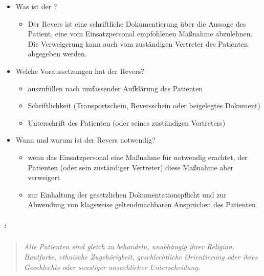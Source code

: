 \begin{itemize}
    \item Was ist der ?
    \begin{itemize}
        \item {\mdseries
        Der Revers ist eine schriftliche Dokumentierung \"uber die Aussage des
        Patient, eine vom Einsatz\-personal empfohlenen Ma{\ss}nahme
        abzulehnen. Die Verweigerung kann auch vom zuständigen Vertreter des
        Patienten abgegeben werden.}
    \end{itemize}
\end{itemize}
\begin{itemize}
    \item Welche Voraussetzungen hat der Revers?
    \begin{itemize}
        \item auszuf\"ullen nach umfassender Aufklärung des Patienten
        \item Schriftlichkeit (Transportschein, Reversschein oder beigelegtes
        Dokument)
        \item Unterschrift des Patienten (oder seines zuständigen Vertreters)
    \end{itemize}
\end{itemize}
\begin{itemize}
    \item Wann und warum ist der Revers notwendig?
    \begin{itemize}
        \item {\mdseries
        wenn das Einsatzpersonal eine Ma{\ss}nahme f\"ur notwendig erachtet,
        der Patienten  (oder sein zuständiger Vertreter) diese Ma{\ss}nahme
        aber verweigert}
        \item zur Einhaltung der gesetzlichen Dokumentationspflicht und zur Abwendung
        von  klagsweise geltendmachbaren Anspr\"uchen des Patienten
    \end{itemize}
\end{itemize}

\subparagraph*{:}

\begin{quote}
\emph{Alle Patienten sind gleich zu behandeln, unabhängig ihrer
Religion, Hautfarbe, ethnische Zugehörigkeit,
geschlechtliche Orientierung oder ihres Geschlechts oder
sonstiger unsachlicher Unterscheidung.} 
\end{quote}


